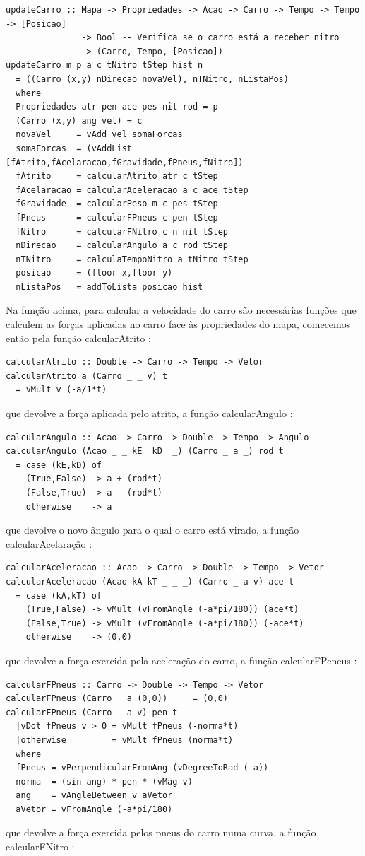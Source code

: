 \documentclass[a4paper]{report} %
\begin{document}
\begin{verbatim}
updateCarro :: Mapa -> Propriedades -> Acao -> Carro -> Tempo -> Tempo -> [Posicao]
               -> Bool -- Verifica se o carro está a receber nitro
               -> (Carro, Tempo, [Posicao])
updateCarro m p a c tNitro tStep hist n
  = ((Carro (x,y) nDirecao novaVel), nTNitro, nListaPos)
  where
  Propriedades atr pen ace pes nit rod = p
  (Carro (x,y) ang vel) = c
  novaVel     = vAdd vel somaForcas
  somaForcas  = (vAddList [fAtrito,fAcelaracao,fGravidade,fPneus,fNitro])
  fAtrito     = calcularAtrito atr c tStep
  fAcelaracao = calcularAceleracao a c ace tStep
  fGravidade  = calcularPeso m c pes tStep
  fPneus      = calcularFPneus c pen tStep
  fNitro      = calcularFNitro c n nit tStep
  nDirecao    = calcularAngulo a c rod tStep
  nTNitro     = calculaTempoNitro a tNitro tStep
  posicao     = (floor x,floor y)
  nListaPos   = addToLista posicao hist
\end{verbatim}
Na função acima, para calcular a velocidade do carro são necessárias funções que calculem as forças aplicadas no carro face às propriedades do mapa, comecemos então pela função calcularAtrito :

\begin{verbatim}
calcularAtrito :: Double -> Carro -> Tempo -> Vetor
calcularAtrito a (Carro _ _ v) t 
  = vMult v (-a/1*t)
\end{verbatim}
que devolve a força aplicada pelo atrito, a função calcularAngulo :

\begin{verbatim}
calcularAngulo :: Acao -> Carro -> Double -> Tempo -> Angulo
calcularAngulo (Acao _ _ kE  kD  _) (Carro _ a _) rod t
  = case (kE,kD) of
    (True,False) -> a + (rod*t)
    (False,True) -> a - (rod*t)
    otherwise    -> a
\end{verbatim}
que devolve o novo ângulo para o qual o carro está virado, a função calcularAcelaração :

\begin{verbatim}
calcularAceleracao :: Acao -> Carro -> Double -> Tempo -> Vetor
calcularAceleracao (Acao kA kT _ _ _) (Carro _ a v) ace t
  = case (kA,kT) of
    (True,False) -> vMult (vFromAngle (-a*pi/180)) (ace*t)
    (False,True) -> vMult (vFromAngle (-a*pi/180)) (-ace*t)
    otherwise    -> (0,0)
\end{verbatim}
que devolve a força exercida pela aceleração do carro, a função calcularFPeneus : 

\begin{verbatim}
calcularFPneus :: Carro -> Double -> Tempo -> Vetor
calcularFPneus (Carro _ a (0,0)) _ _ = (0,0)
calcularFPneus (Carro _ a v) pen t
  |vDot fPneus v > 0 = vMult fPneus (-norma*t)
  |otherwise         = vMult fPneus (norma*t)
  where
  fPneus = vPerpendicularFromAng (vDegreeToRad (-a))
  norma  = (sin ang) * pen * (vMag v)
  ang    = vAngleBetween v aVetor
  aVetor = vFromAngle (-a*pi/180)
\end{verbatim}
que devolve a força exercida pelos pneus do carro numa curva, a função calcularFNitro : 
\end{document}
